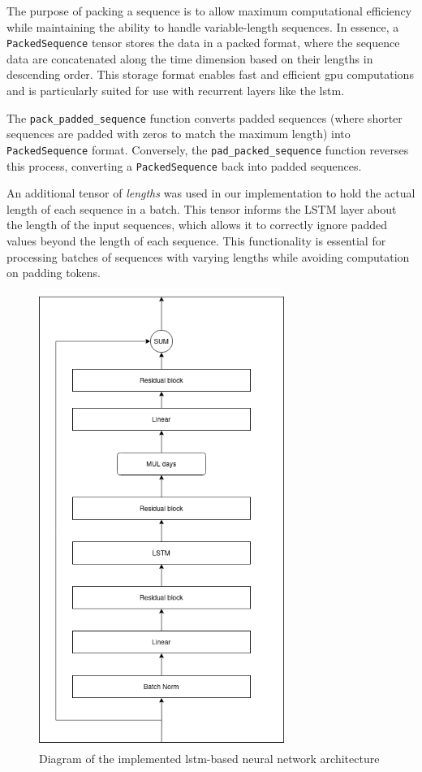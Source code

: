 The purpose of packing a sequence is to allow maximum computational efficiency
while maintaining the ability to handle variable-length sequences. In essence,
a \texttt{PackedSequence} tensor stores the data in a packed format, where the
sequence data are concatenated along the time dimension based on their lengths
in descending order. This storage format enables fast and efficient \gls{gpu}
computations and is particularly suited for use with recurrent layers like the
\gls{lstm}.

The \texttt{pack\_padded\_sequence} function converts padded sequences (where
shorter sequences are padded with zeros to match the maximum length) into
\texttt{PackedSequence} format. Conversely, the \texttt{pad\_packed\_sequence}
function reverses this process, converting a \texttt{PackedSequence} back into
padded sequences.

An additional tensor of \textit{lengths} was used in our implementation to hold
the actual length of each sequence in a batch. This tensor informs the LSTM
layer about the length of the input sequences, which allows it to correctly
ignore padded values beyond the length of each sequence. This functionality is
essential for processing batches of sequences with varying lengths while
avoiding computation on padding tokens.

\begin{figure}
    \centering
    \includegraphics[width=8cm]{files/nn_diagram}
    \caption{Diagram of the implemented \gls{lstm}-based neural network architecture}
    \label{fig:nn_diagram}
\end{figure}

